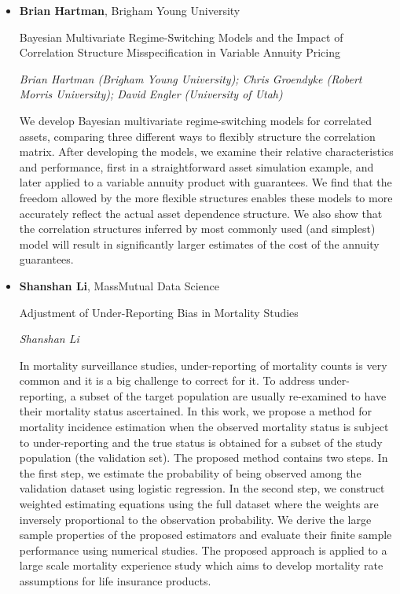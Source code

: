 \begin{itemize}
\item \textbf{Brian Hartman}, Brigham Young University

Bayesian Multivariate Regime-Switching Models and the Impact of Correlation Structure Misspecification in Variable Annuity Pricing

\emph{\footnotesize Brian Hartman (Brigham Young University); Chris Groendyke (Robert Morris University); David Engler (University of Utah)}

We develop Bayesian multivariate regime-switching models for correlated assets, comparing three different ways to flexibly structure the correlation matrix. After developing the models, we examine their relative characteristics and performance, first in a straightforward asset simulation example, and later applied to a variable annuity product with guarantees. We find that the freedom allowed by the more flexible structures enables these models to more accurately reflect the actual asset dependence structure.  We also show that the correlation structures inferred by most commonly used (and simplest) model will result in significantly larger estimates of the cost of the annuity guarantees.

\item \textbf{Shanshan Li}, MassMutual Data Science

Adjustment of Under-Reporting Bias in Mortality Studies

\emph{\footnotesize Shanshan Li}

In mortality surveillance studies, under-reporting of mortality counts is very common and it is a big challenge to correct for it. To address under-reporting, a subset of the target population are usually re-examined to have their mortality status ascertained. In this work, we propose a method for mortality incidence estimation when the observed mortality status is subject to under-reporting and the true status is obtained for a subset of the study population (the validation set). The proposed method contains two steps. In the first step, we estimate the probability of being observed among the validation dataset using logistic regression. In the second step, we construct weighted estimating equations using the full dataset where the weights are inversely proportional to the observation probability. We derive the large sample properties of the proposed estimators and evaluate their finite sample performance using numerical studies. The proposed approach is applied to a large scale mortality experience study which aims to develop mortality rate assumptions for life insurance products.


\end{itemize}
